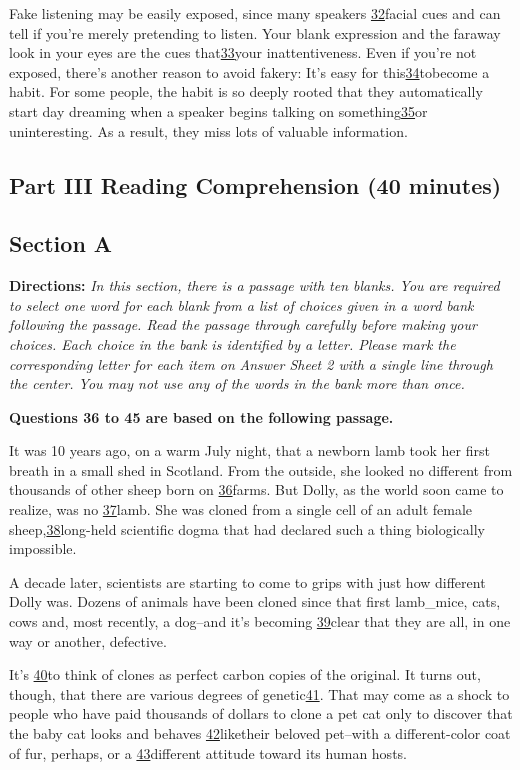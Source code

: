 \documentclass[UTF8,11pt]{ctexart}
\begin{document}
Fake listening may be easily exposed, since many speakers \uline{32}facial cues and can tell if you're merely pretending to listen. Your blank expression and the faraway look in your eyes are the cues that\uline{33}your inattentiveness. Even if you're not exposed, there's another reason to avoid fakery: It's easy for this\uline{34}tobecome a habit. For some people, the habit is so deeply rooted that they automatically start day dreaming when a speaker begins talking on something\uline{35}or uninteresting. As a result, they miss lots of valuable information.


\subsection*{\textbf{Part} III \textbf{Reading} \textbf{Comprehension} \textbf{(40 minutes)}}


\subsection*{\textbf{Section A}}


\textbf{Directions:}\textit{ In this section, there is a passage with ten blanks. You are required to select one word for each blank} \textit{from a list of choices given in a word bank following the passage. Read the passage through carefully before making} \textit{your choices. Each choice in the bank is identified by a letter. Please mark the corresponding letter for each item on} \textit{Answer Sheet 2 with a single line through the center. You may not use any of the words in the bank more than once.}


\textbf{Questions 36 to 45 are based on the following passage.}


It was 10 years ago, on a warm July night, that a newborn lamb took her first breath in a small shed in Scotland. From the outside, she looked no different from thousands of other sheep born on \uline{36}farms. But Dolly, as the world soon came to realize, was no \uline{37}lamb. She was cloned from a single cell of an adult female sheep,\uline{38}long-held scientific dogma that had declared such a thing biologically impossible.


A decade later, scientists are starting to come to grips with just how different Dolly was. Dozens of animals have been cloned since that first lamb\_mice, cats, cows and, most recently, a dog--and it's becoming \uline{39}clear that they are all, in one way or another, defective.


It's \uline{40}to think of clones as perfect carbon copies of the original. It turns out, though, that there are various degrees of genetic\uline{41}. That may come as a shock to people who have paid thousands of dollars to clone a pet cat only to discover that the baby cat looks and behaves \uline{42}liketheir beloved pet--with a different-color coat of fur, perhaps, or a \uline{43}different attitude toward its human hosts.
\end{document}
